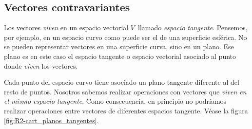 \subsection{Vectores contravariantes}
Los vectores \emph{viven} en un espacio vectorial $V$\, llamado
\emph{espacio tangente}.
Pensemos, por ejemplo, en un espacio curvo como puede ser el de una superficie
esférica.
No se pueden representar vectores en una superficie curva, sino en un plano.
Ese plano es en este caso el espacio tangente o espacio vectorial asociado al
punto donde \emph{viven} los vectores.

Cada punto  del espacio curvo tiene asociado un plano tangente diferente al del resto
de puntos. Nosotros sabemos realizar operaciones con vectores que
\emph{viven en el mismo espacio tangente}. Como consecuencia, en principio no podríamos
realizar operaciones entre vectores de diferentes espacios tangente\footnotemark{}.
Véase la figura \ref{fig:R2-cart_planos_tangentes}.
